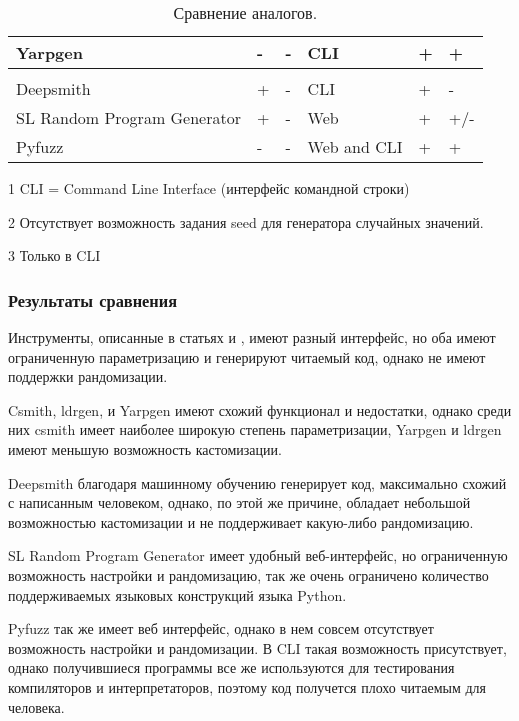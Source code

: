 \begin{table}[ht]
\begin{threeparttable}[t]
\begin{tabular}{p{5.1em}|m{4em}m{5em}m{4em}m{4em}m{4em}}
    Yarpgen                                                          & -                    & -                       & CLI                 & +                    & +                      \\
    \hline                                                                                                                                                                                  \\
    Deepsmith                                                        & +                    & -                       & CLI                 & +                    & -                      \\
    \hline
    SL Random Program Generator & + & - & Web & + & +/-\tnote{2}   \\
    \hline
    Pyfuzz & - & - & Web and CLI & +\tnote{3}   & +\tnote{3}  \\
    \hline
\end{tabular}
\caption{
    \label{table-smth}
    Сравнение аналогов.}
\begin{tablenotes}
 \item[1] CLI = Command Line Interface (интерфейс командной строки)
 \item[2] Отсутствует возможность задания seed для генератора случайных значений.
 \item[3] Только в CLI
\end{tablenotes}
\end{threeparttable}
\end{table}
\clearpage

\subsubsection{Результаты сравнения}

Инструменты, описанные в статьях \cite{pg-eli} и \cite{acg-2021}, имеют разный интерфейс, но оба
имеют ограниченную параметризацию и генерируют читаемый код, однако не имеют поддержки рандомизации.

Csmith, ldrgen, и Yarpgen имеют схожий функционал и недостатки, однако среди них csmith имеет наиболее
широкую степень параметризации, Yarpgen и ldrgen имеют меньшую возможность кастомизации.

Deepsmith благодаря машинному обучению генерирует код, максимально схожий с написанным человеком,
однако, по этой же причине, обладает небольшой возможностью кастомизации и не поддерживает какую-либо
рандомизацию.

SL Random Program Generator имеет удобный веб-интерфейс, но ограниченную возможность
настройки и рандомизацию, так же очень ограничено количество поддерживаемых языковых конструкций языка Python.

Pyfuzz так же имеет веб интерфейс, однако в нем совсем отсутствует возможность настройки и рандомизации.
В CLI такая возможность присутствует, однако получившиеся программы все же используются для 
тестирования компиляторов и интерпретаторов, поэтому код получется плохо читаемым для человека.